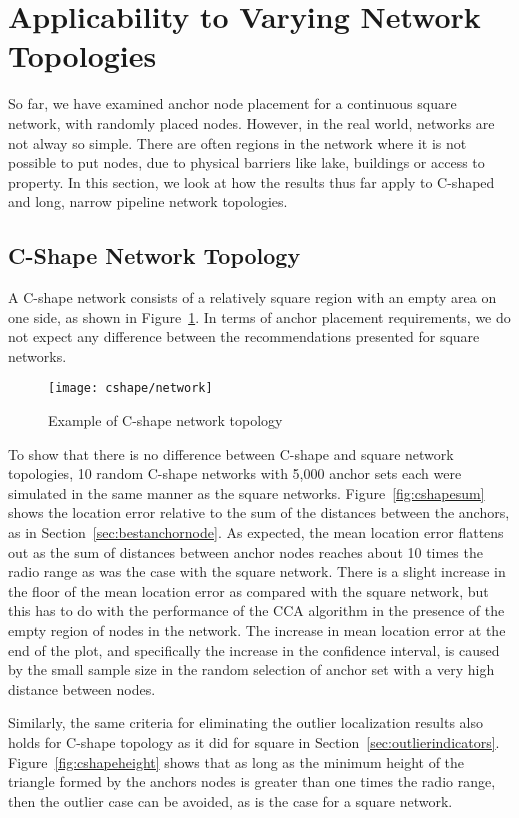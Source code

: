 \section{Applicability to Varying Network Topologies}

So far, we have examined anchor node placement for a continuous square network, with randomly placed nodes.  However, in the real world, networks are not alway so simple.  There are often regions in the network where it is not possible to put nodes, due to physical barriers like lake, buildings or access to property.  In this section, we look at how the results thus far apply to C-shaped and long, narrow pipeline network topologies.

\subsection{C-Shape Network Topology}

A C-shape network consists of a relatively square region with an empty area on one side, as shown in Figure~\ref{fig:cnetwork}.  In terms of anchor placement requirements, we do not expect any difference between the recommendations presented for square networks.

\begin{figure}
  \centering
	\texttt{[image: cshape/network]}
	\caption{Example of C-shape network topology}
	\label{fig:cnetwork}
\end{figure}

To show that there is no difference between C-shape and square network topologies, 10 random C-shape networks with 5,000 anchor sets each were simulated in the same manner as the square networks.  Figure~\ref{fig:cshapesum} shows the location error relative to the sum of the distances between the anchors, as in Section~\ref{sec:bestanchornode}.  As expected, the mean location error flattens out as the sum of distances between anchor nodes reaches about 10 times the radio range as was the case with the square network.  There is a slight increase in the floor of the mean location error as compared with the square network, but this has to do with the performance of the CCA algorithm in the presence of the empty region of nodes in the network.  The increase in mean location error at the end of the plot, and specifically the increase in the confidence interval, is caused by the small sample size in the random selection of anchor set with a very high distance between nodes.
 
Similarly, the same criteria for eliminating the outlier localization results also holds for C-shape topology as it did for square in Section~\ref{sec:outlierindicators}.  Figure~\ref{fig:cshapeheight} shows that as long as the minimum height of the triangle formed by the anchors nodes is greater than one times the radio range, then the outlier case can be avoided, as is the case for a square network.

